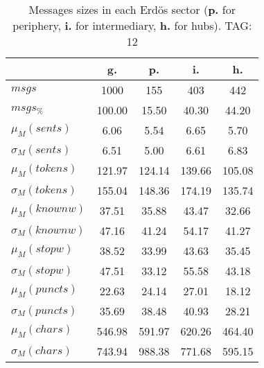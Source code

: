 \begin{table}[h!]
\begin{center}
\begin{tabular}{| l || c | c | c | c |}\hline
 & {\bf g.} & {\bf p.} & {\bf i.} & {\bf h.} \\\hline\hline
$msgs$ & 1000  & 155  & 403  & 442 \\
$msgs_{\%}$ & 100.00  & 15.50  & 40.30  & 44.20 \\\hline
$\mu_M(sents)$ & 6.06  & 5.54  & 6.65  & 5.70 \\
$\sigma_M(sents)$ & 6.51  & 5.00  & 6.61  & 6.83 \\\hline
$\mu_M(tokens)$ & 121.97  & 124.14  & 139.66  & 105.08 \\
$\sigma_M(tokens)$ & 155.04  & 148.36  & 174.19  & 135.74 \\\hline
$\mu_M(knownw)$ & 37.51  & 35.88  & 43.47  & 32.66 \\
$\sigma_M(knownw)$ & 47.16  & 41.24  & 54.17  & 41.27 \\\hline
$\mu_M(stopw)$ & 38.52  & 33.99  & 43.63  & 35.45 \\
$\sigma_M(stopw)$ & 47.51  & 33.12  & 55.58  & 43.18 \\\hline
$\mu_M(puncts)$ & 22.63  & 24.14  & 27.01  & 18.12 \\
$\sigma_M(puncts)$ & 35.69  & 38.48  & 40.93  & 28.21 \\\hline
$\mu_M(chars)$ & 546.98  & 591.97  & 620.26  & 464.40 \\
$\sigma_M(chars)$ & 743.94  & 988.38  & 771.68  & 595.15 \\\hline
\end{tabular}
\caption{Messages sizes in each Erd\"os sector ({{\bf p.}} for periphery, {{\bf i.}} for intermediary, {{\bf h.}} for hubs). TAG: 12}
\end{center}
\end{table}